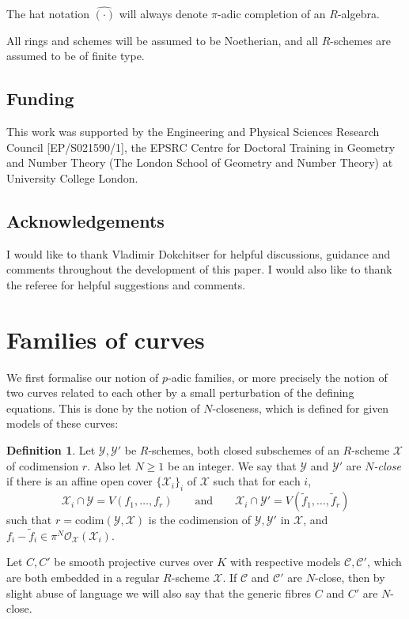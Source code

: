 \documentclass{article}
\theoremstyle{definition}
\newtheorem{defn}{Definition}[section]
\theoremstyle{plain}
\theoremstyle{remark}
\newcommand{\comp}[1]{\widehat{#1}}
\newcommand{\codim}{\mathrm{codim}}
\begin{document}
	The hat notation $\comp{(\cdot)}$ will always denote $\pi$-adic completion of an $R$-algebra.
	
	All rings and schemes will be assumed to be Noetherian, and all $R$-schemes are assumed to be of finite type.
	\subsection*{Funding}
	This work was supported by the Engineering and Physical Sciences Research Council [EP/S021590/1], the EPSRC Centre for Doctoral Training in Geometry and Number Theory (The London School of Geometry and Number Theory) at University College London.
	\subsection*{Acknowledgements}
	I would like to thank Vladimir Dokchitser for helpful discussions, guidance and comments throughout the development of this paper. I would also like to thank the referee for helpful suggestions and comments.

	
	\section{Families of curves}\label{section_closeness}
	We first formalise our notion of $p$-adic families, or more precisely the notion of two curves related to each other by a small perturbation of the defining equations. This is done by the notion of $N$-closeness, which is defined for given models of these curves:
	\begin{defn}\label{N-closeness}
		Let $\mathcal{Y},\mathcal{Y}'$ be $R$-schemes, both closed subschemes of an $R$-scheme $\mathcal{X}$ of codimension $r$. Also let $N\ge 1$ be an integer. We say that $\mathcal{Y}$ and $\mathcal{Y}'$ are \emph{$N$-close} if there is an affine open cover $\{\mathcal{X}_i\}_i$ of $\mathcal{X}$ such that for each $i$, 
		\[\mathcal{X}_i\cap \mathcal{Y} = V(f_1, \ldots, f_r)\qquad \text{and} \qquad \mathcal{X}_i\cap \mathcal{Y}' = V(\widetilde{f}_1, \ldots, \widetilde{f}_r)\]
		such that $r = \codim(\mathcal{Y}, \mathcal{X})$ is the codimension of $\mathcal{Y}, \mathcal{Y}'$ in $\mathcal{X}$, and $f_i-\widetilde{f}_i\in \pi^N\mathcal{O}_\mathcal{X}(\mathcal{X}_i)$.
		
		Let $C, C'$ be smooth projective curves over $K$ with respective models $\mathcal{C}, \mathcal{C}'$, which are both embedded in a regular $R$-scheme $\mathcal{X}$. If $\mathcal{C}$ and $\mathcal{C}'$ are $N$-close, then by slight abuse of language we will also say that the generic fibres $C$ and $C'$ are $N$-close.
	\end{defn}
	
\end{document}
